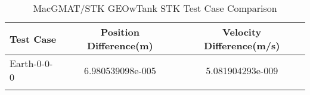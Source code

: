 \begin{table}[htbp!]
\centering
\caption{ MacGMAT/STK GEOwTank STK Test Case Comparison}
      \begin{tabular}{lcc}
      \hline\hline
          Test Case & Position Difference(m) & Velocity Difference(m/s) \\
         \hline
         Earth-0-0-0 & 6.980539098e-005 & 5.081904293e-009 \\
      \hline\hline
      \label{Table: GEOwTank STK Table} 
\end{tabular}
\end{table}
